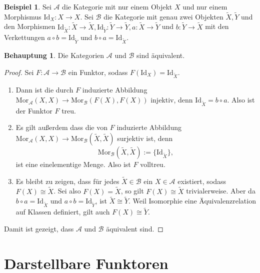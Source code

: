 \documentclass{article}
\theoremstyle{plain}
\theoremstyle{definition}
\newtheorem{conj}{Behauptung}[section]
\newtheorem{exmp}{Beispiel}[section]
\theoremstyle{remark}
\begin{document}
\begin{exmp}
Sei $\mathcal{A}$ die Kategorie mit nur einem Objekt $X$ und nur einem Morphismus $\text{Id}_X: X \rightarrow X$. Sei $\mathcal{B}$ die Kategorie mit genau zwei Objekten $\widetilde{X}, \widetilde{Y}$ und den Morphismen $\text{Id}_{\widetilde{X}}:\widetilde{X} \rightarrow \widetilde{X}, \text{Id}_{\widetilde{Y}}: \widetilde{Y} \rightarrow \widetilde{Y}, a: \widetilde{X} \rightarrow \widetilde{Y}$ und $b: \widetilde{Y} \rightarrow \widetilde{X}$ mit den Verkettungen $a \circ b = \text{Id}_{\widetilde{Y}}$ und $b \circ a = \text{Id}_{\widetilde{X}}$. 
\begin{conj}
Die Kategorien $\mathcal{A}$ und $\mathcal{B}$ sind äquivalent.
\end{conj}
\begin{proof}
Sei $F: \mathcal{A} \rightarrow \mathcal{B}$ ein Funktor, sodass $F(\text{Id}_X) = \text{Id}_{\widetilde{X}}$.
\begin{enumerate}
	\item Dann ist die durch $F$ induzierte Abbildung $\text{Mor}_\mathcal{A}(X,X) \rightarrow \text{Mor}_{\mathcal{B}}(F(X),F(X))$ injektiv, denn $\text{Id}_{\widetilde{X}} = b \circ a$. Also ist der Funktor $F$ treu.
	\item Es gilt außerdem dass die von $F$ induzierte Abbildung $\text{Mor}_\mathcal{A}(X,X) \rightarrow \text{Mor}_{\mathcal{B}}(\widetilde{X},\widetilde{X})$ surjektiv ist, denn
	\begin{equation}
		\text{Mor}_{\mathcal{B}}(\widetilde{X},\widetilde{X}) := \{\text{Id}_{\widetilde{X}}\},
	\end{equation}
	ist eine einelementige Menge. Also ist $F$ volltreu.
	\item Es bleibt zu zeigen, dass für jedes $\widetilde{X} \in \mathcal{B}$ ein $X \in \mathcal{A}$ existiert, sodass $F(X) \cong \widetilde{X}$. Sei also $F(X) = \widetilde{X}$, so gilt $F(X) \cong \widetilde{X}$ trivialerweise. Aber da $b \circ a = \text{Id}_{\widetilde{X}}$ und $a \circ b = \text{Id}_{\widetilde{Y}}$, ist $\widetilde{X} \cong \widetilde{Y}$. Weil Isomorphie eine Äquivalenzrelation auf Klassen definiert, gilt auch $F(X) \cong \widetilde{Y}$.
\end{enumerate}
Damit ist gezeigt, dass $\mathcal{A}$ und $\mathcal{B}$ äquivalent sind.
\end{proof}
\end{exmp}

\section{Darstellbare Funktoren}
\end{document}
